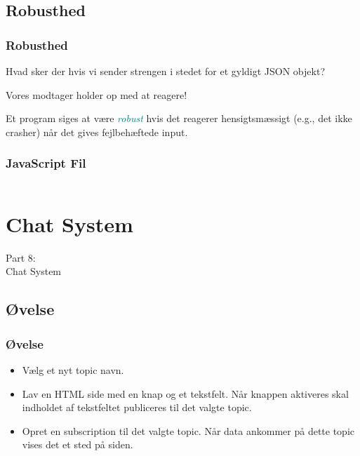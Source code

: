 \subsection{Robusthed}
\begin{frame}
    \frametitle{Robusthed}
    Hvad sker der hvis vi sender strengen  i stedet for et gyldigt JSON objekt?
    \pause
    
    \vspace{5mm}
    Vores modtager holder op med at reagere!
    \pause
    
    \vspace{5mm}
    Et program siges at være \textcolor{teal}{\textsl{robust}} hvis det reagerer hensigtsmæssigt (e.g., det ikke crasher) når det gives fejlbehæftede input.
\end{frame}
\begin{frame}
    \frametitle{JavaScript Fil}
    \vspace{-2mm}
    \begin{multicols}{2}
      \inputminted[fontsize=\tiny,highlightlines={31-35}]{javascript}{../src/frontend/part7_plot/logic.js}
    \end{multicols}
\end{frame}

\section{Chat System}
\begin{frame}
    \vspace{25mm}
    \begin{center}
        \Huge{Part 8:\\Chat System}
    \end{center}
\end{frame}

\subsection{Øvelse}
\begin{frame}
    \frametitle{Øvelse}
    \begin{itemize}
      \item Vælg et nyt topic navn.
      \item Lav en HTML side med en knap og et tekstfelt. Når knappen aktiveres skal indholdet af tekstfeltet publiceres til det valgte topic.
      \item Opret en subscription til det valgte topic. Når data ankommer på dette topic vises det et sted på siden.
    \end{itemize}
\end{frame}

